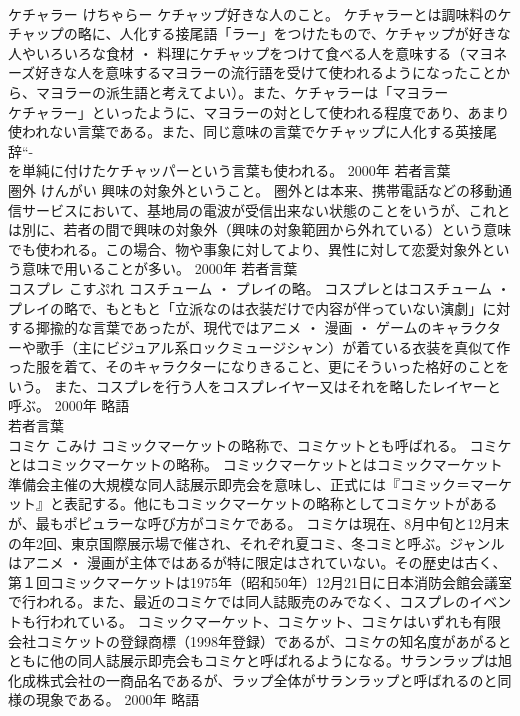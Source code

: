 \documentclass[8pt]{extreport}
\begin{document}
\begin{CJK}{UTF8}{min}
\\	ケチャラー	けちゃらー	ケチャップ好きな人のこと。	ケチャラーとは調味料のケチャップの略に、人化する接尾語「ラー」をつけたもので、ケチャップが好きな人やいろいろな食材 ・ 料理にケチャップをつけて食べる人を意味する（マヨネーズ好きな人を意味するマヨラーの流行語を受けて使われるようになったことから、マヨラーの派生語と考えてよい）。また、ケチャラーは「マヨラー
\\	ケチャラー」といったように、マヨラーの対として使われる程度であり、あまり使われない言葉である。また、同じ意味の言葉でケチャップに人化する英接尾辞“-
\\	を単純に付けたケチャッパーという言葉も使われる。	2000年	若者言葉	
\\	圏外	けんがい	興味の対象外ということ。	圏外とは本来、携帯電話などの移動通信サービスにおいて、基地局の電波が受信出来ない状態のことをいうが、これとは別に、若者の間で興味の対象外（興味の対象範囲から外れている）という意味でも使われる。この場合、物や事象に対してより、異性に対して恋愛対象外という意味で用いることが多い。	2000年	若者言葉	
\\	コスプレ	こすぷれ	コスチューム ・ プレイの略。	コスプレとはコスチューム ・ プレイの略で、もともと「立派なのは衣装だけで内容が伴っていない演劇」に対する揶揄的な言葉であったが、現代ではアニメ ・ 漫画 ・ ゲームのキャラクターや歌手（主にビジュアル系ロックミュージシャン）が着ている衣装を真似て作った服を着て、そのキャラクターになりきること、更にそういった格好のことをいう。 また、コスプレを行う人をコスプレイヤー又はそれを略したレイヤーと呼ぶ。	2000年	略語 
\\	若者言葉	
\\	コミケ	こみけ	コミックマーケットの略称で、コミケットとも呼ばれる。	コミケとはコミックマーケットの略称。 コミックマーケットとはコミックマーケット準備会主催の大規模な同人誌展示即売会を意味し、正式には『コミック＝マーケット』と表記する。他にもコミックマーケットの略称としてコミケットがあるが、最もポピュラーな呼び方がコミケである。 コミケは現在、8月中旬と12月末の年2回、東京国際展示場で催され、それぞれ夏コミ、冬コミと呼ぶ。ジャンルはアニメ ・ 漫画が主体ではあるが特に限定はされていない。その歴史は古く、第１回コミックマーケットは1975年（昭和50年）12月21日に日本消防会館会議室で行われる。また、最近のコミケでは同人誌販売のみでなく、コスプレのイベントも行われている。 コミックマーケット、コミケット、コミケはいずれも有限会社コミケットの登録商標（1998年登録）であるが、コミケの知名度があがるとともに他の同人誌展示即売会もコミケと呼ばれるようになる。サランラップは旭化成株式会社の一商品名であるが、ラップ全体がサランラップと呼ばれるのと同様の現象である。	2000年	略語 

\end{CJK}
\end{document}
